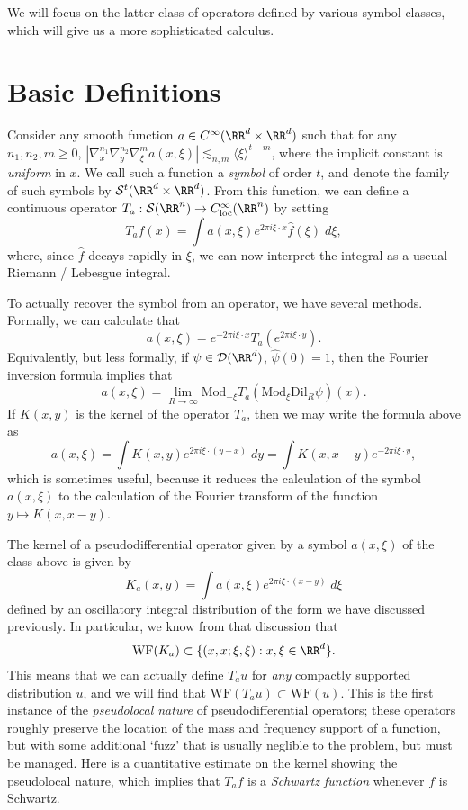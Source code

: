 %
We will focus on the latter class of operators defined by various symbol classes, which will give us a more sophisticated calculus.

\section{Basic Definitions}

Consider any smooth function $a \in C^\infty(\RR^d \times \RR^d)$ such that for any $n_1,n_2,m \geq 0$, $|\nabla_x^{n_1} \nabla_y^{n_2} \nabla_\xi^m a(x,\xi)| \lesssim_{n,m} \langle \xi \rangle^{t - m}$, where the implicit constant is \emph{uniform} in $x$. We call such a function a \emph{symbol} of order $t$, and denote the family of such symbols by $\mathcal{S}^t(\RR^d \times \RR^d)$. From this function, we can define a continuous operator $T_a: \mathcal{S}(\RR^n) \to C^\infty_{\text{loc}}(\RR^n)$ by setting
%
\[ T_a f(x) = \int a(x,\xi) e^{2 \pi i \xi \cdot x} \widehat{f}(\xi)\; d\xi, \]
%
where, since $\widehat{f}$ decays rapidly in $\xi$, we can now interpret the integral as a useual Riemann / Lebesgue integral.

To actually recover the symbol from an operator, we have several methods. Formally, we can calculate that
%
\[ a(x,\xi) = e^{-2 \pi i \xi \cdot x} T_a(e^{2 \pi i \xi \cdot y}). \]
%
Equivalently, but less formally, if $\psi \in \mathcal{D}(\RR^d)$, $\widehat{\psi}(0) = 1$, then the Fourier inversion formula implies that
%
\[ a(x,\xi) = \lim_{R \to \infty} \text{Mod}_{-\xi} T_a(\text{Mod}_{\xi} \text{Dil}_R \psi) (x). \]
%
If $K(x,y)$ is the kernel of the operator $T_a$, then we may write the formula above as
%
\[ a(x,\xi) = \int K(x,y) e^{2 \pi i \xi \cdot (y-x)}\; dy = \int K(x,x - y) e^{-2 \pi i \xi \cdot y}, \]
%
which is sometimes useful, because it reduces the calculation of the symbol $a(x,\xi)$ to the calculation of the Fourier transform of the function $y \mapsto K(x,x-y)$.

The kernel of a pseudodifferential operator given by a symbol $a(x,\xi)$ of the class above is given by
%
\[ K_a(x,y) = \int a(x,\xi) e^{2 \pi i \xi \cdot (x - y)}\; d\xi \]
%
defined by an oscillatory integral distribution of the form we have discussed previously. In particular, we know from that discussion that
%
\[ \text{WF}(K_a) \subset \{ (x,x;\xi,\xi) : x, \xi \in \RR^d \}. \]
%
This means that we can actually define $T_a u$ for \emph{any} compactly supported distribution $u$, and we will find that $\text{WF}(T_a u) \subset \text{WF}(u)$. This is the first instance of the \emph{pseudolocal nature} of pseudodifferential operators; these operators roughly preserve the location of the mass and frequency support of a function, but with some additional `fuzz' that is usually neglible to the problem, but must be managed. Here is a quantitative estimate on the kernel showing the pseudolocal nature, which implies that $T_a f$ is a \emph{Schwartz function} whenever $f$ is Schwartz.

